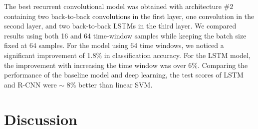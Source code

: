\documentclass{article}
\begin{document}

The best recurrent convolutional model was obtained with architecture \#2 containing two back-to-back convolutions in the first layer, one convolution in the second layer, and two back-to-back LSTMs in the third layer. We compared results using both 16 and 64 time-window samples while keeping the batch size fixed at 64 samples. For the model using 64 time windows, we noticed a significant improvement of 1.8\% in classification accuracy. For the LSTM model, the improvement with increasing the time window was over 6\%. Comparing the performance of the baseline model and deep learning, the test scores of LSTM and R-CNN were $\sim$ 8\% better than linear SVM.

\section{Discussion}
\end{document}

